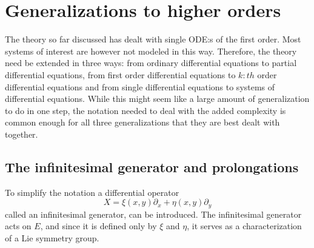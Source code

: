 \section{Generalizations to higher orders}

The theory so far discussed has dealt with single ODE:s of the first order.
Most systems of interest are however not modeled in this way.
Therefore, the theory need be extended in three ways: from ordinary differential equations to partial differential equations, from first order differential equations to \(k:th\) order differential equations and from single differential equations to systems of differential equations.
While this might seem like a large amount of generalization to do in one step, the notation needed to deal with the added complexity is common enough for all three generalizations that they are best dealt with together.

\subsection{The infinitesimal generator and prolongations}

To simplify the notation a differential operator
\begin{equation}
  X = \xi(x,y) \partial_x + \eta(x,y) \partial_y
\end{equation}
called an infinitesimal generator, can be introduced.
The infinitesimal generator acts on \(E\), and since it is defined only by \(\xi\) and \(\eta\), it serves as a characterization of a Lie symmetry group.



